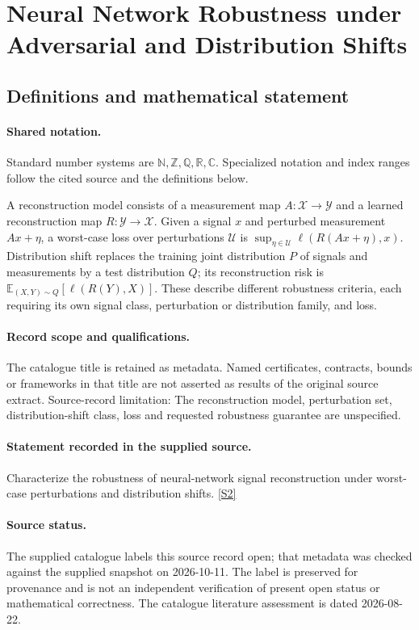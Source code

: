 \documentclass[11pt]{article}
\newcommand{\sref}[2]{\hyperlink{source:#1:#2}{[S#2]}}
\begin{document}
\section{Neural Network Robustness under Adversarial and Distribution Shifts}\label{statement}

\subsection{Definitions and mathematical statement}

\paragraph{Shared notation.}Standard number systems are $\mathbb N,\mathbb Z,\mathbb Q,\mathbb R,\mathbb C$. Specialized notation and index ranges follow the cited source and the definitions below.


A reconstruction model consists of a measurement map $A:\mathcal X\to\mathcal Y$ and a learned reconstruction map $R:\mathcal Y\to\mathcal X$. Given a signal $x$ and perturbed measurement $Ax+\eta$, a worst-case loss over perturbations $\mathcal U$ is $\sup_{\eta\in\mathcal U}\ell(R(Ax+\eta),x)$. Distribution shift replaces the training joint distribution $P$ of signals and measurements by a test distribution $Q$; its reconstruction risk is $\mathbb E_{(X,Y)\sim Q}[\ell(R(Y),X)]$. These describe different robustness criteria, each requiring its own signal class, perturbation or distribution family, and loss.
\paragraph{Record scope and qualifications.}
The catalogue title is retained as metadata. Named certificates, contracts, bounds or frameworks in that title are not asserted as results of the original source extract.
Source-record limitation: The reconstruction model, perturbation set, distribution-shift class, loss and requested robustness guarantee are unspecified.
\paragraph{Statement recorded in the supplied source.}
Characterize the robustness of neural-network signal reconstruction under worst-case perturbations and distribution shifts. \sref{statement}{2}
\paragraph{Source status.}
The supplied catalogue labels this source record open; that metadata was checked against the supplied snapshot on 2026-10-11. The label is preserved for provenance and is not an independent verification of present open status or mathematical correctness. The catalogue literature assessment is dated 2026-08-22.
\end{document}
